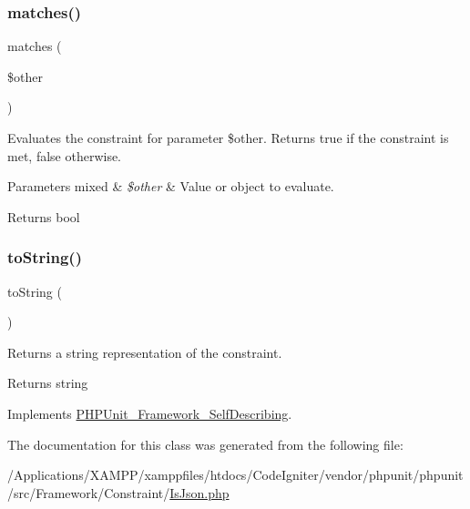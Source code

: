 \subsubsection{\texorpdfstring{matches()}{matches()}}
{\footnotesize\ttfamily matches (\begin{DoxyParamCaption}\item[{}]{\$other }\end{DoxyParamCaption})\hspace{0.3cm}{\ttfamily [protected]}}

Evaluates the constraint for parameter \$other. Returns true if the constraint is met, false otherwise.


\begin{DoxyParams}[1]{Parameters}
mixed & {\em \$other} & Value or object to evaluate.\\
\hline
\end{DoxyParams}
\begin{DoxyReturn}{Returns}
bool 
\end{DoxyReturn}
\mbox{\label{class_p_h_p_unit___framework___constraint___is_json_a5558c5d549f41597377fa1ea8a1cefa3}} 
\subsubsection{\texorpdfstring{to\+String()}{toString()}}
{\footnotesize\ttfamily to\+String (\begin{DoxyParamCaption}{ }\end{DoxyParamCaption})}

Returns a string representation of the constraint.

\begin{DoxyReturn}{Returns}
string 
\end{DoxyReturn}


Implements \mbox{\hyperlink{interface_p_h_p_unit___framework___self_describing_a5558c5d549f41597377fa1ea8a1cefa3}{P\+H\+P\+Unit\+\_\+\+Framework\+\_\+\+Self\+Describing}}.



The documentation for this class was generated from the following file\+:\begin{DoxyCompactItemize}
\item 
/\+Applications/\+X\+A\+M\+P\+P/xamppfiles/htdocs/\+Code\+Igniter/vendor/phpunit/phpunit/src/\+Framework/\+Constraint/\mbox{\hyperlink{_is_json_8php}{Is\+Json.\+php}}\end{DoxyCompactItemize}
